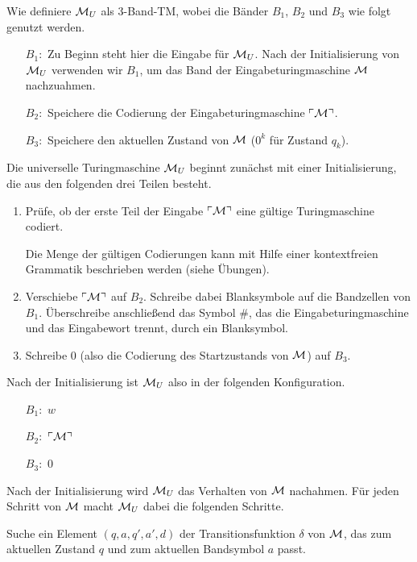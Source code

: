 Wie definiere $\mathcal{M}_U$ als 3-Band-\ac{TM}, wobei die Bänder $B_1$, $B_2$ und $B_3$ wie folgt genutzt werden.
\begin{itemize}
\item[$B_1:$] Zu Beginn steht hier die Eingabe für $\mathcal{M}_U$.
Nach der Initialisierung von $\mathcal{M}_U$ verwenden wir $B_1$, um das Band der Eingabeturingmaschine $\mathcal{M}$ nachzuahmen.
\item[$B_2:$] Speichere die Codierung der Eingabeturingmaschine $\ulcorner \mathcal{M} \urcorner$.
\item[$B_3:$] Speichere den aktuellen Zustand von $\mathcal{M}$ ($0^k$ für Zustand $q_k$).
\end{itemize}

Die universelle Turingmaschine $\mathcal{M}_U$ beginnt zunächst mit einer Initialisierung, die aus den folgenden drei Teilen besteht.

\begin{enumerate}
 \item Prüfe, ob der erste Teil der Eingabe $\ulcorner \mathcal{M} \urcorner$ eine gültige Turingmaschine codiert.
 
 Die Menge der gültigen Codierungen kann mit Hilfe einer kontextfreien Grammatik beschrieben werden (siehe Übungen).
 
 \item Verschiebe $\ulcorner \mathcal{M} \urcorner$ auf $B_2$. Schreibe dabei Blanksymbole auf die Bandzellen von $B_1$.
 Überschreibe anschließend das Symbol $\#$, das die Eingabeturingmaschine und das Eingabewort trennt, durch ein Blanksymbol.
 
 \item Schreibe $0$ (also die Codierung des Startzustands von $\mathcal{M}$) auf $B_3$.
\end{enumerate}

Nach der Initialisierung ist $\mathcal{M}_U$ also in der folgenden Konfiguration.
\begin{itemize}
\item[$B_1:$] $w$
\item[$B_2:$] $\ulcorner \mathcal{M} \urcorner$
\item[$B_3:$] $0$
\end{itemize}

Nach der Initialisierung wird $\mathcal{M}_U$ das Verhalten von $\mathcal{M}$ nachahmen.
Für jeden Schritt von $\mathcal{M}$ macht $\mathcal{M}_U$ dabei die folgenden Schritte.

 Suche ein Element $(q, a, q', a', d)$ der Transitionsfunktion $\delta$ von $\mathcal{M}$, das zum aktuellen Zustand $q$ und zum aktuellen Bandsymbol $a$ passt.
 
